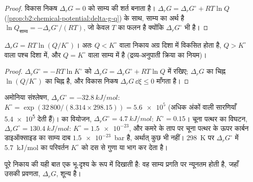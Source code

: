 \begin{proof}
विकास निकष $\Delta_r G = 0$ को साम्य की शर्त बनाता है।
$\Delta_r G = \Delta_r G^\circ + RT\ln Q$
(\cref{prop:b2:chemical-potential:delta-g-q}) के साथ, साम्य का अर्थ है $\ln Q_{\text{साम्य}}
= -\Delta_r G^\circ/(RT)$, जो केवल $T$ का फलन है क्योंकि $\Delta_r G^\circ$ भी है।
\end{proof}

\begin{corollary}[प्रथम वर्ष के खंड के नियम]\label{cor:b2:equilibrium-shifts:mass-action}
$\Delta_r G = RT\ln(Q/K^\circ)$। अतः $Q < K^\circ$ वाला निकाय अग्र दिशा में
विकसित होता है, $Q > K^\circ$ वाला पश्च दिशा में, और $Q = K^\circ$ वाला
साम्य में है (द्रव्य-अनुपाती क्रिया का नियम)।
\end{corollary}

\begin{proof}
$\Delta_r G^\circ = -RT\ln K^\circ$ को $\Delta_r G = \Delta_r G^\circ
+ RT\ln Q$ में रखिए; $\Delta_r G$ का चिह्न $\ln(Q/K^\circ)$ का चिह्न है, और
विकास निकष $\Delta_r G\,\dd\xi \leq 0$ माँगता है।
\end{proof}

\begin{example}[\qty{298}{K} पर तीन स्थिरांक]\label{ex:b2:equilibrium-shifts:constants}
अमोनिया संश्लेषण, $\Delta_r G^\circ = \qty{-32.8}{kJ/mol}$: $K^\circ =
\exp(32\,800/(8.314 \times 298.15)) = \num{5.6e5}$ (अधिक अंकों वाली सारणियाँ
\num{5.4e5} देती हैं)।  का वियोजन, $\Delta_r G^\circ =
\qty{+4.7}{kJ/mol}$: $K^\circ = 0.15$। चूना पत्थर का विघटन,
$\Delta_r G^\circ = \qty{+130.4}{kJ/mol}$: $K^\circ = \num{1.5e-23}$, और
कमरे के ताप पर चूना पत्थर के ऊपर कार्बन डाइऑक्साइड का साम्य दाब
$\num{1.5e-23}$~\unit{bar} है, अर्थात् कुछ भी नहीं। \qty{298}{K} पर $\Delta_r G^\circ$ में
\qty{5.7}{kJ/mol} का परिवर्तन $K^\circ$ को दस से गुणा या भाग कर देता है।
\end{example}

पूरे निकाय की  यही बात एक भू-दृश्य के रूप में दिखाती है:
वह साम्य प्रगति पर न्यूनतम होती है, जहाँ उसकी प्रवणता, $\Delta_r G$,
शून्य है।

